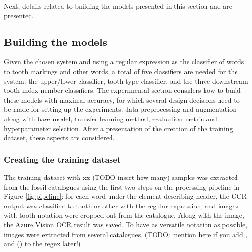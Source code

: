 \documentclass{article}
\begin{document}
Next, details related to building the models presented in this section and are 
presented.

\subsection{Building the models}
\label{sect:building-models}


Given the chosen system and using a regular expression as the classifier of words to tooth markings 
and other words, a total of five classifiers are needed for the system: the upper/lower classifier, 
tooth type classifier, and the three downstream tooth index number classifiers. The experimental 
section considers how to build these models with maximal accuracy, for which several design decisions 
need to be made for setting up the experiments: data preprocessing and augmentation along with base model,
transfer learning method, evaluation metric and hyperparameter selection. After a presentation of the creation 
of the training dataset, these aspects are considered.

\subsubsection{Creating the training dataset}

The training dataset with xx (TODO insert how many) samples was extracted from the fossil 
catalogues using the first two steps on the processing pipeline in Figure \ref{fig:pipeline}:
for each word under the element describing header, the OCR output was classified 
to tooth or other with the regular expression, and 
images with tooth notation were cropped out from the catalogue. Along with the image, the 
Azure Vision OCR result was saved. To have as versatile notation as possible, images were 
extracted from several catalogues.  
(TODO: mention here if you add , and () to the regex later!)
\end{document}
